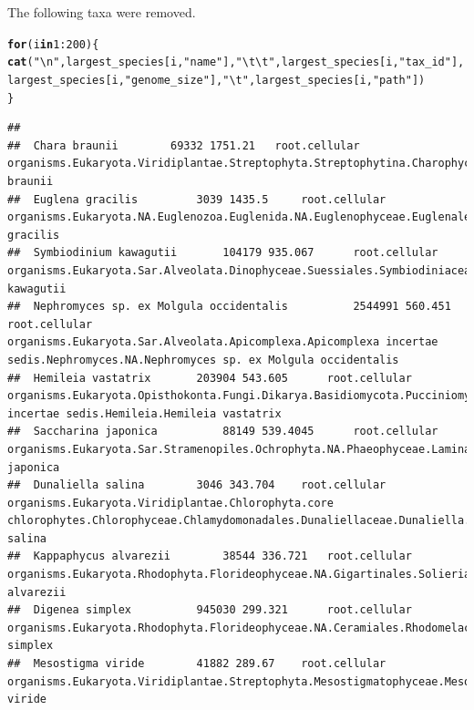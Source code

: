 \documentclass{article}\usepackage[]{graphicx}\usepackage[]{color}
\makeatletter
\newcommand{\hlnum}[1]{\textcolor[rgb]{0.686,0.059,0.569}{#1}}%
\newcommand{\hlstr}[1]{\textcolor[rgb]{0.192,0.494,0.8}{#1}}%
\newcommand{\hlopt}[1]{\textcolor[rgb]{0,0,0}{#1}}%
\newcommand{\hlstd}[1]{\textcolor[rgb]{0.345,0.345,0.345}{#1}}%
\newcommand{\hlkwa}[1]{\textcolor[rgb]{0.161,0.373,0.58}{\textbf{#1}}}%
\newcommand{\hlkwd}[1]{\textcolor[rgb]{0.737,0.353,0.396}{\textbf{#1}}}%
\newenvironment{kframe}{%
 \def\at@end@of@kframe{}%
 \ifinner\ifhmode%
  \def\at@end@of@kframe{\end{minipage}}%
  \begin{minipage}{\columnwidth}%
 \fi\fi%
 \def\FrameCommand##1{\hskip\@totalleftmargin \hskip-\fboxsep
 \colorbox{shadecolor}{##1}\hskip-\fboxsep
     \hskip-\linewidth \hskip-\@totalleftmargin \hskip\columnwidth}%
 \MakeFramed {\advance\hsize-\width
   \@totalleftmargin\z@ \linewidth\hsize
   \@setminipage}}%
 {\par\unskip\endMakeFramed%
 \at@end@of@kframe}
\newenvironment{knitrout}{}{} %
\makeatother
\begin{document}
The following taxa were removed.
\begin{knitrout}
\color{fgcolor}\begin{kframe}
\begin{alltt}
\hlkwa{for} \hlstd{(i} \hlkwa{in} \hlnum{1}\hlopt{:}\hlnum{200}\hlstd{) \{}
   \hlkwd{cat}\hlstd{(}\hlstr{"\textbackslash{}n"}\hlstd{, largest_species[i,} \hlstr{"name"}\hlstd{],} \hlstr{"\textbackslash{}t\textbackslash{}t"}\hlstd{,  largest_species[i,} \hlstr{"tax_id"}\hlstd{], largest_species[i,} \hlstr{"genome_size"}\hlstd{],} \hlstr{"\textbackslash{}t"}\hlstd{,  largest_species[i,} \hlstr{"path"}\hlstd{] )}
 \hlstd{\}}
\end{alltt}
\begin{verbatim}
## 
##  Chara braunii 		 69332 1751.21 	 root.cellular organisms.Eukaryota.Viridiplantae.Streptophyta.Streptophytina.Charophyceae.Charales.Characeae.Chara.Chara braunii
##  Euglena gracilis 		 3039 1435.5 	 root.cellular organisms.Eukaryota.NA.Euglenozoa.Euglenida.NA.Euglenophyceae.Euglenales.Euglenaceae.Euglena.Euglena gracilis
##  Symbiodinium kawagutii 		 104179 935.067 	 root.cellular organisms.Eukaryota.Sar.Alveolata.Dinophyceae.Suessiales.Symbiodiniaceae.Symbiodinium.Symbiodinium kawagutii
##  Nephromyces sp. ex Molgula occidentalis 		 2544991 560.451 	 root.cellular organisms.Eukaryota.Sar.Alveolata.Apicomplexa.Apicomplexa incertae sedis.Nephromyces.NA.Nephromyces sp. ex Molgula occidentalis
##  Hemileia vastatrix 		 203904 543.605 	 root.cellular organisms.Eukaryota.Opisthokonta.Fungi.Dikarya.Basidiomycota.Pucciniomycotina.Pucciniomycetes.Pucciniales.Pucciniales incertae sedis.Hemileia.Hemileia vastatrix
##  Saccharina japonica 		 88149 539.4045 	 root.cellular organisms.Eukaryota.Sar.Stramenopiles.Ochrophyta.NA.Phaeophyceae.Laminariales.Laminariaceae.Saccharina.Saccharina japonica
##  Dunaliella salina 		 3046 343.704 	 root.cellular organisms.Eukaryota.Viridiplantae.Chlorophyta.core chlorophytes.Chlorophyceae.Chlamydomonadales.Dunaliellaceae.Dunaliella.Dunaliella salina
##  Kappaphycus alvarezii 		 38544 336.721 	 root.cellular organisms.Eukaryota.Rhodophyta.Florideophyceae.NA.Gigartinales.Solieriaceae.Kappaphycus.Kappaphycus alvarezii
##  Digenea simplex 		 945030 299.321 	 root.cellular organisms.Eukaryota.Rhodophyta.Florideophyceae.NA.Ceramiales.Rhodomelaceae.NA.Digenea.Digenea simplex
##  Mesostigma viride 		 41882 289.67 	 root.cellular organisms.Eukaryota.Viridiplantae.Streptophyta.Mesostigmatophyceae.Mesostigmatales.Mesostigmataceae.Mesostigma.Mesostigma viride

\end{verbatim}
\end{kframe}
\end{knitrout}
\end{document}
